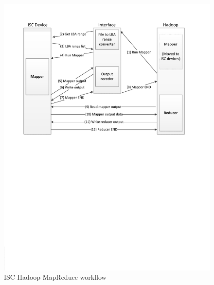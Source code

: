 \begin{figure}[htbp]
	\centering
		\includegraphics[width=0.98\columnwidth]{figures/ISC_Hadoop_Flowchart.pdf}
	\caption{ISC Hadoop MapReduce workflow}
	\label{fig:ISC_Hadoop_flow}
\end{figure}




